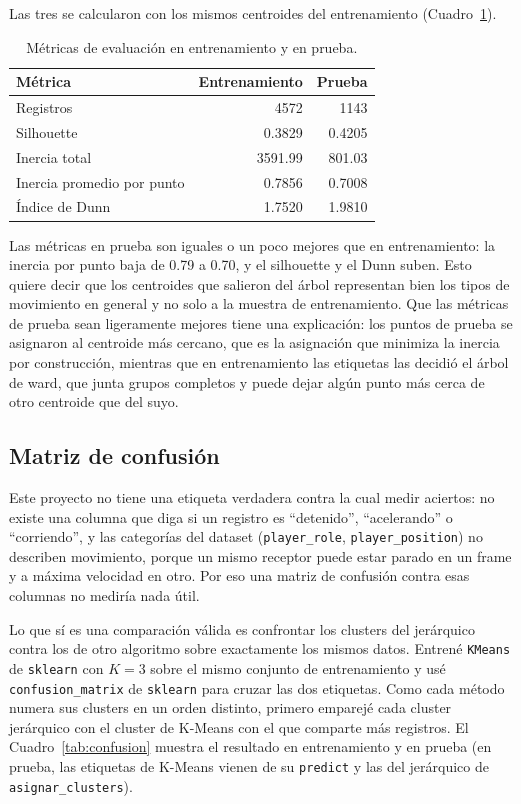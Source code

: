 \documentclass[11pt,a4paper]{article}
\begin{document}
Las tres se calcularon con los mismos centroides del entrenamiento (Cuadro~\ref{tab:metricas}).

\begin{table}[H]
  \centering
  \begin{tabular}{lrr}
    \toprule
    Métrica & Entrenamiento & Prueba \\
    \midrule
    Registros & 4572 & 1143 \\
    Silhouette & 0.3829 & 0.4205 \\
    Inercia total & 3591.99 & 801.03 \\
    Inercia promedio por punto & 0.7856 & 0.7008 \\
    Índice de Dunn & 1.7520 & 1.9810 \\
    \bottomrule
  \end{tabular}
  \caption{Métricas de evaluación en entrenamiento y en prueba.}
  \label{tab:metricas}
\end{table}

Las métricas en prueba son iguales o un poco mejores que en entrenamiento: la inercia por punto baja de 0.79 a 0.70, y el silhouette y el Dunn suben. Esto quiere decir que los centroides que salieron del árbol representan bien los tipos de movimiento en general y no solo a la muestra de entrenamiento. Que las métricas de prueba sean ligeramente mejores tiene una explicación: los puntos de prueba se asignaron al centroide más cercano, que es la asignación que minimiza la inercia por construcción, mientras que en entrenamiento las etiquetas las decidió el árbol de ward, que junta grupos completos y puede dejar algún punto más cerca de otro centroide que del suyo.

\subsection{Matriz de confusión}

Este proyecto no tiene una etiqueta verdadera contra la cual medir aciertos: no existe una columna que diga si un registro es ``detenido'', ``acelerando'' o ``corriendo'', y las categorías del dataset (\texttt{player\_role}, \texttt{player\_position}) no describen movimiento, porque un mismo receptor puede estar parado en un frame y a máxima velocidad en otro. Por eso una matriz de confusión contra esas columnas no mediría nada útil.

Lo que sí es una comparación válida es confrontar los clusters del jerárquico contra los de otro algoritmo sobre exactamente los mismos datos. Entrené \texttt{KMeans} de \texttt{sklearn} con $K=3$ sobre el mismo conjunto de entrenamiento y usé \texttt{confusion\_matrix} de \texttt{sklearn} para cruzar las dos etiquetas. Como cada método numera sus clusters en un orden distinto, primero emparejé cada cluster jerárquico con el cluster de K-Means con el que comparte más registros. El Cuadro~\ref{tab:confusion} muestra el resultado en entrenamiento y en prueba (en prueba, las etiquetas de K-Means vienen de su \texttt{predict} y las del jerárquico de \texttt{asignar\_clusters}).
\end{document}
